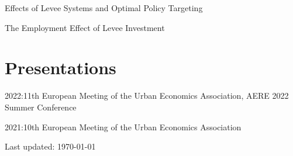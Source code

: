 \documentclass[letterpaper]{article}
\def\footerlink{}
\renewenvironment{itemize}{
  \begin{list}{}{
    \setlength{\leftmargin}{1.5em}
  }
}{
  \end{list}
}
\begin{document}
\begin{itemize}
\item Effects of Levee Systems and Optimal Policy Targeting
\item The Employment Effect of Levee Investment
\end{itemize}

\section*{Presentations}

\begin{itemize}
\item 2022:11th European Meeting of the Urban Economics Association, AERE 2022 Summer Conference
\item 2021:10th European Meeting of the Urban Economics Association
\end{itemize}


\bigskip

\begin{center}
  \begin{footnotesize}
    Last updated: \today \\
    \href{\footerlink}{\texttt{\footerlink}}
  \end{footnotesize}
\end{center}
\end{document}

